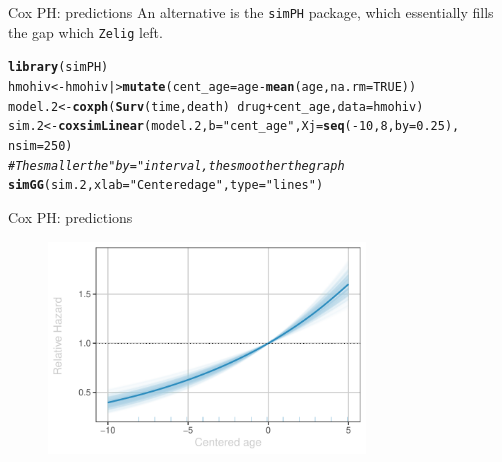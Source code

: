 \documentclass[12pt,english,pdf,xcolor=dvipsnames,aspectratio=169,handout]{beamer}\usepackage[]{graphicx}\usepackage[]{xcolor}
\makeatletter
\newcommand{\hlnum}[1]{\textcolor[rgb]{0.686,0.059,0.569}{#1}}%
\newcommand{\hlstr}[1]{\textcolor[rgb]{0.192,0.494,0.8}{#1}}%
\newcommand{\hlcom}[1]{\textcolor[rgb]{0.678,0.584,0.686}{\textit{#1}}}%
\newcommand{\hlopt}[1]{\textcolor[rgb]{0,0,0}{#1}}%
\newcommand{\hlstd}[1]{\textcolor[rgb]{0.345,0.345,0.345}{#1}}%
\newcommand{\hlkwb}[1]{\textcolor[rgb]{0.69,0.353,0.396}{#1}}%
\newcommand{\hlkwc}[1]{\textcolor[rgb]{0.333,0.667,0.333}{#1}}%
\newcommand{\hlkwd}[1]{\textcolor[rgb]{0.737,0.353,0.396}{\textbf{#1}}}%
\newenvironment{kframe}{%
 \def\at@end@of@kframe{}%
 \ifinner\ifhmode%
  \def\at@end@of@kframe{\end{minipage}}%
  \begin{minipage}{\columnwidth}%
 \fi\fi%
 \def\FrameCommand##1{\hskip\@totalleftmargin \hskip-\fboxsep
 \colorbox{shadecolor}{##1}\hskip-\fboxsep
     \hskip-\linewidth \hskip-\@totalleftmargin \hskip\columnwidth}%
 \MakeFramed {\advance\hsize-\width
   \@totalleftmargin\z@ \linewidth\hsize
   \@setminipage}}%
 {\par\unskip\endMakeFramed%
 \at@end@of@kframe}
\newenvironment{knitrout}{}{} %
\makeatother
\begin{document}
\begin{frame}[fragile]{Cox PH: predictions}
An alternative is the \texttt{simPH} package, which essentially fills the gap which \texttt{Zelig} left.\bigskip

\begin{knitrout}\scriptsize
{}\color{fgcolor}\begin{kframe}
\begin{alltt}
\hlkwd{library}\hlstd{(simPH)}
\hlstd{hmohiv} \hlkwb{<-} \hlstd{hmohiv |>} \hlkwd{mutate}\hlstd{(}\hlkwc{cent_age} \hlstd{= age} \hlopt{-} \hlkwd{mean}\hlstd{(age,} \hlkwc{na.rm} \hlstd{=} \hlnum{TRUE}\hlstd{))}
\hlstd{model.2} \hlkwb{<-} \hlkwd{coxph}\hlstd{(}\hlkwd{Surv}\hlstd{(time, death)} \hlopt{~} \hlstd{drug} \hlopt{+} \hlstd{cent_age,} \hlkwc{data} \hlstd{= hmohiv)}
\hlstd{sim.2} \hlkwb{<-} \hlkwd{coxsimLinear}\hlstd{(model.2,} \hlkwc{b} \hlstd{=} \hlstr{"cent_age"}\hlstd{,} \hlkwc{Xj} \hlstd{=} \hlkwd{seq}\hlstd{(}\hlopt{-}\hlnum{10}\hlstd{,} \hlnum{8}\hlstd{,} \hlkwc{by} \hlstd{=} \hlnum{0.25}\hlstd{),}
                      \hlkwc{nsim} \hlstd{=} \hlnum{250}\hlstd{)}
\hlcom{# The smaller the "by=" interval, the smoother the graph}
\hlkwd{simGG}\hlstd{(sim.2,} \hlkwc{xlab} \hlstd{=} \hlstr{"Centered age"}\hlstd{,} \hlkwc{type} \hlstd{=} \hlstr{"lines"}\hlstd{)}
\end{alltt}
\end{kframe}
\end{knitrout}



\end{frame}



\begin{frame}[fragile]{Cox PH: predictions}

\begin{figure}
\centering
\includegraphics[width=0.75\textwidth]{../03-graphs/02-03}
\end{figure}
\end{frame}
\end{document}
